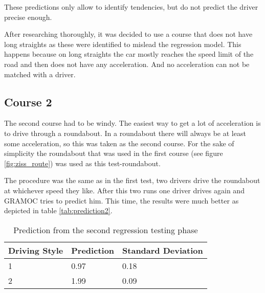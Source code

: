 These predictions only allow to identify tendencies, but do not predict the driver precise enough.

After researching thoroughly, it was decided to use a course that does not have long straights as these were identified to mislead the regression model. This happens because on long straights the car mostly reaches the speed limit of the road and then does not have any acceleration. And no acceleration can not be matched with a driver.

\subsection{Course 2}

The second course had to be windy. The easiest way to get a lot of acceleration is to drive through a roundabout. In a roundabout there will always be at least some acceleration, so this was taken as the second course. For the sake of simplicity the roundabout that was used in the first course (see figure \vref{fig:ziss_route}) was used as this test-roundabout.

The procedure was the same as in the first test, two drivers drive the roundabout at whichever speed they like. After this two runs one driver drives again and GRAMOC tries to predict him. This time, the results were much better as depicted in table \vref{tab:prediction2}.

\begin{table}[H]
\centering
\begin{tabular}{|l|l|l|}
\hline
\textbf{Driving Style} & \textbf{Prediction} & \textbf{Standard Deviation} \\ \hline
1                      & 0.97                & 0.18 \\ \hline
2                      & 1.99                & 0.09 \\ \hline
\end{tabular}
\caption{Prediction from the second regression testing phase}
\label{tab:prediction2}
\end{table}

